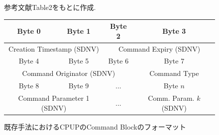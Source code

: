 \begin{figure}[htbp]
    \centering
    \caption{既存手法におけるCPUPのCommand Blockのフォーマット}
    \label{figure:command_block_format}
    \begin{minipage}{\textwidth}
        \centering
        \vspace{1mm} 
        \fontsize{10.5pt}{12pt}\selectfont
        参考文献\cite{Bezirgiannidis2013}Table2をもとに作成. 
        \vspace{1mm} 
    \end{minipage}
    \begin{tabular}{|c|c|c|c|}
      \hline
      Byte 0 & Byte 1 & Byte 2 & Byte 3 \\
      \hline
      \multicolumn{2}{|c|}{Creation Timestamp (SDNV)} & \multicolumn{2}{c|}{Command Expiry (SDNV)} \\
      \hline
      Byte 4 & Byte 5 & Byte 6 & Byte 7 \\
      \hline
      \multicolumn{3}{|c|}{Command Originator (SDNV)} & Command Type \\
      \hline
      Byte 8 & Byte 9 & ... & Byte $n$ \\
      \hline
      \multicolumn{2}{|c|}{Command Parameter 1 (SDNV)} & \multicolumn{1}{c|}{...} & Comm. Param. $k$ (SDNV) \\
      \hline
    \end{tabular}
  \end{figure}
  